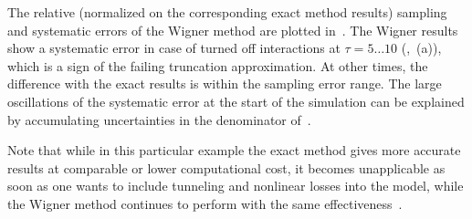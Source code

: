 The relative (normalized on the corresponding exact method results) sampling and systematic errors of the Wigner method are plotted in~.
The Wigner results show a systematic error in case of turned off interactions at $\tau = 5 \ldots 10$ (,~(a)), which is a sign of the failing truncation approximation.
At other times, the difference with the exact results is within the sampling error range.
The large oscillations of the systematic error at the start of the simulation can be explained by accumulating uncertainties in the denominator of~.

Note that while in this particular example the exact method gives more accurate results at comparable or lower computational cost, it becomes unapplicable as soon as one wants to include tunneling and nonlinear losses into the model, while the Wigner method continues to perform with the same effectiveness~\cite{Opanchuk2012a}.

